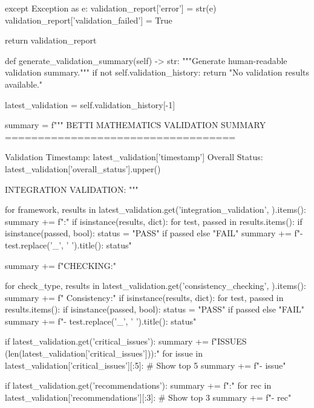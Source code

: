         except Exception as e:
            validation_report['error'] = str(e)
            validation_report['validation_failed'] = True
            
        return validation_report
        
    def generate_validation_summary(self) -> str:
        """Generate human-readable validation summary."""
        if not self.validation_history:
            return "No validation results available."
            
        latest_validation = self.validation_history[-1]
        
        summary = f"""
BETTI MATHEMATICS VALIDATION SUMMARY
===================================

Validation Timestamp: {latest_validation['timestamp']}
Overall Status: {latest_validation['overall_status'].upper()}

INTEGRATION VALIDATION:
"""
        
        for framework, results in latest_validation.get('integration_validation', {}).items():
            summary += f":"
            if isinstance(results, dict):
                for test, passed in results.items():
                    if isinstance(passed, bool):
                        status = "PASS" if passed else "FAIL"
                        summary += f"\n  - {test.replace('_', ' ').title()}: {status}"
        
        summary += f"\n\nCONSISTENCY CHECKING:"
        
        for check_type, results in latest_validation.get('consistency_checking', {}).items():
            summary += f" Consistency:"
            if isinstance(results, dict):
                for test, passed in results.items():
                    if isinstance(passed, bool):
                        status = "PASS" if passed else "FAIL"
                        summary += f"\n  - {test.replace('_', ' ').title()}: {status}"
        
        if latest_validation.get('critical_issues'):
            summary += f"\n\nCRITICAL ISSUES ({len(latest_validation['critical_issues'])}):"
            for issue in latest_validation['critical_issues'][:5]:  \# Show top 5
                summary += f"\n  - {issue}"
        
        if latest_validation.get('recommendations'):
            summary += f"\n\nRECOMMENDATIONS:"
            for rec in latest_validation['recommendations'][:3]:  \# Show top 3
                summary += f"\n  - {rec}"
        
